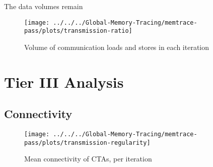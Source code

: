 The data volumes remain 
\begin{figure}[t]
	\centering
	\texttt{[image: ../../../Global-Memory-Tracing/memtrace-pass/plots/transmission-ratio]}
	\caption{Volume of communication loads and stores in each iteration}
	\label{trans-ratio}
\end{figure}
\newpage
\section{Tier III Analysis}
\subsection{Connectivity}
\begin{figure}[t]
	\centering
		\texttt{[image: ../../../Global-Memory-Tracing/memtrace-pass/plots/transmission-regularity]}
	\caption{Mean connectivity of CTAs, per iteration}
	\label{philandering}
\end{figure}